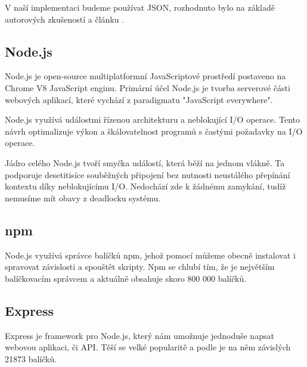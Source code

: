 \documentclass[thesis=B,czech]{FITthesis}[2012/06/26]
\begin{document}
        V naší implementaci budeme používat JSON, rozhodnuto bylo na základě autorových zkušeností a článku \cite{whyJSON}.
        \subsection{Node.js}
            Node.js je open-source multiplatformní JavaScriptové prostředí postaveno na Chrome V8 JavaScript enginu. Primární účel Node.js je tvorba serverové části webových aplikací, které vychází z paradigmatu "JavaScript everywhere".
            
            Node.js využívá událostmi řízenou architekturu a neblokující I/O operace. Tento návrh optimalizuje výkon a škálovatelnost programů s častými požadavky na I/O operace.
            
            Jádro celého Node.js tvoří smyčka událostí, která běží na jednom vlákně. Ta podporuje desetitisíce souběžných připojení bez nutnosti neustálého přepínání kontextu díky neblokujícímu I/O. Nedochází zde k žádnému zamykání, tudíž nemusíme mít obavy z deadlocku systému.
            \cite{node}
        \subsection{npm}
            Node.js využívá správce balíčků npm, jehož pomocí můžeme obecně instalovat i spravovat závislosti a spouštět skripty. Npm se chlubí tím, že je největším balíčkovacím správcem a aktuálně obsahuje skoro 800 000 balíčků.
            \cite{modulecounts}
        \subsection{Express}
            Express je framework pro Node.js, který nám umožnuje jednoduše napsat webovou aplikaci, či API. Těší se velké popularitě a podle \cite{npmrank} je na něm závislých 21873 balíčků.
\end{document}
